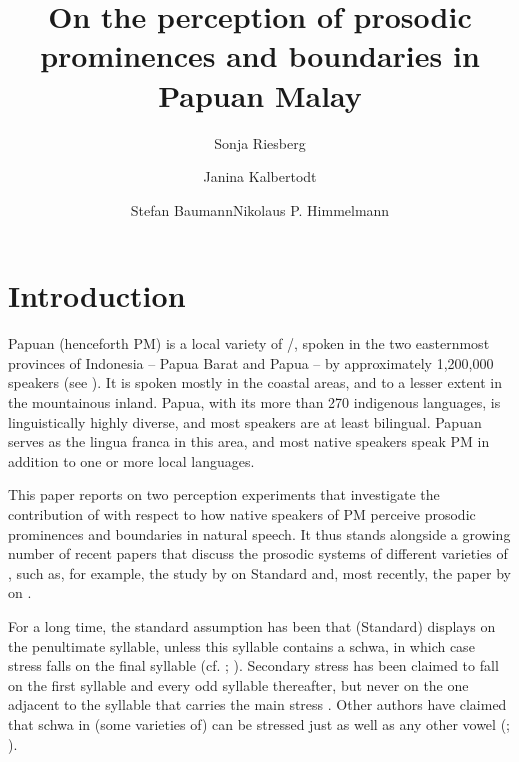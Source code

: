 \documentclass[output=paper
,modfonts
,nonflat]{langsci/langscibook}
\title{On the perception of prosodic prominences and boundaries in Papuan Malay}
\author{Sonja Riesberg\affiliation{Universität zu Köln \& Centre of Excellence for the Dynamics of Language, The Australian National University}\and Janina Kalbertodt\affiliation{Universität zu Köln}\and Stefan Baumann\affiliation{Universität zu Köln}\lastand Nikolaus P. Himmelmann\affiliation{Universität zu Köln}}
\begin{document}
\maketitle

\section{\label{s:riesberg:1}Introduction}

Papuan  (henceforth PM) is a local variety of /, spoken in the two easternmost provinces of Indonesia – Papua Barat and Papua – by approximately 1,200,000 speakers (see \citealt{Kluge2014}). It is spoken mostly in the coastal areas, and to a lesser extent in the mountainous inland.  Papua, with its more than 270 indigenous languages, is linguistically highly diverse, and most speakers are at least bilingual. Papuan  serves as the lingua franca in this area, and most native speakers speak PM in addition to one or more local languages.

This paper reports on two perception experiments that investigate the contribution of  with respect to how native speakers of PM perceive prosodic prominences and boundaries in natural speech. It thus stands alongside a growing number of recent papers that discuss the prosodic systems of different varieties of , such as, for example, the study by \citet{Goedemans2007} on Standard  and, most recently, the paper by \citet{Maskikit-Essed2016} on  .  

For a long time, the standard assumption has been that (Standard)  displays  on the penultimate syllable, unless this syllable contains a schwa, in which case stress falls on the final syllable (cf. \citealt{Alieva1991}; \citealt{Cohn1989}). Secondary stress has been claimed to fall on the first syllable and every odd syllable thereafter, but never on the one adjacent to the syllable that carries the main stress \citep{Cohn1994}. Other authors have claimed that schwa in (some varieties of)  can be stressed just as well as any other vowel (\citealt{Halim1974}; \citealt{Laksman1994}). 
\end{document}

